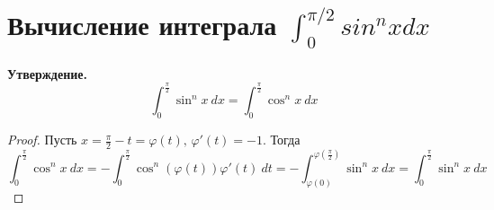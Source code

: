 \section{Вычисление интеграла $\int_{0}^{\pi/2} sin^n x dx$}
\textbf{Утверждение.}
\begin{equation*}
  \int_{0}^{\frac{\pi}{2}} \sin^n x \: dx =
  \int_{0}^{\frac{\pi}{2}} \cos^n x \: dx
\end{equation*}
\begin{proof}
    Пусть $x = \frac{\pi}{2} - t = \varphi(t), \, \varphi'(t) = -1$. Тогда
    \begin{equation*}
      \int_{0}^{\frac{\pi}{2}} \cos^n x \: dx = -\int_{0}^{\frac{\pi}{2}} \cos^n(\varphi(t))\varphi'(t) \: dt = -\int_{\varphi(0)}^{\varphi(\frac{\pi}{2})} \sin^n x\: dx =\int_{0}^{\frac{\pi}{2}} \sin^n x \: dx
    \end{equation*}
\end{proof}

